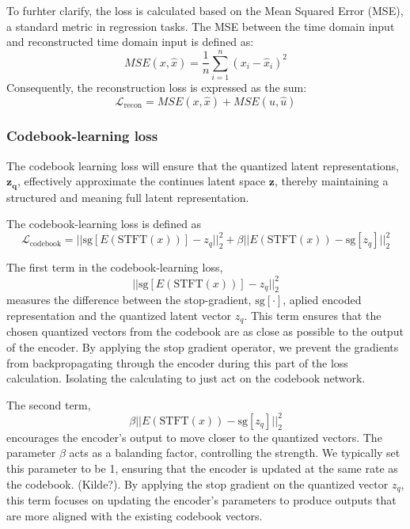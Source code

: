 To furhter clarify, the loss is calculated based on the Mean Squared Error (MSE), a standard metric in regression tasks. The MSE between the time domain input and reconstructed time domain input is defined as:
\begin{equation}
    MSE(x, \hat{x}) = \frac{1}{n} \sum_{i=1}^n (x_i - \hat{x}_i)^2
\end{equation}
Consequently, the reconstruction loss is expressed as the sum:
\begin{equation}
    \mathcal{L}_{\text{recon}} = MSE(x,\hat{x}) + MSE(u, \hat{u})
    \label{eq:recon}
\end{equation}

\subsubsection{Codebook-learning loss}
The codebook learning loss will ensure that the quantized latent representations, $\mathbf{z_q}$, effectively approximate the continues latent space $\mathbf{z}$, thereby maintaining a structured and meaning full latent representation. 

The codebook-learning loss is defined as
\begin{equation}
    \mathcal{L}_\text{codebook} = ||\text{sg}\left[ E(\text{STFT}(x))\right] - z_q||_2^2 + \beta|| E(\text{STFT}(x)) - \text{sg}\left[ z_q \right]||_2^2
\end{equation}

The first term in the codebook-learning loss,
\begin{equation}
    ||\text{sg}\left[ E(\text{STFT}(x))\right] - z_q||_2^2
\end{equation}
measures the difference between the stop-gradient, $\text{sg}\left[\cdot\right]$, aplied encoded representation and the quantized latent vector $z_q$. This term ensures that the chosen quantized vectors from the codebook are as close as possible to the output of the encoder. By applying the stop gradient operator, we prevent the gradients from backpropagating through the encoder during this part of the loss calculation.
Isolating the calculating to just act on the codebook network.

The second term,
\begin{equation}
    \beta|| E(\text{STFT}(x)) - \text{sg}\left[ z_q \right]||_2^2
\end{equation}
encourages the encoder's output to move closer to the quantized vectors. The parameter $\beta$ acts as a balanding factor, controlling the strength.  We typically set this parameter to be 1, ensuring that the encoder is updated at the same rate as the codebook.
(Kilde?). By applying the stop gradient on the quantized vector $z_q$, this term focuses on updating the encoder's parameters to produce outputs that are more aligned with the existing
codebook vectors.

